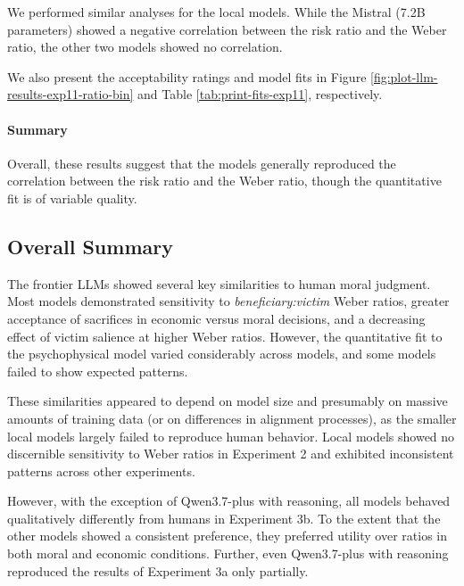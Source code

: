 \documentclass[
]{article}
\begin{document}
We performed similar analyses for the local models. While the Mistral (7.2B parameters) showed a negative correlation between the risk ratio and the Weber ratio, the other two models showed no correlation.

We also present the acceptability ratings and model fits in Figure \ref{fig:plot-llm-results-exp11-ratio-bin} and Table \ref{tab:print-fits-exp11}, respectively.

\paragraph{Summary}\label{summary-2}

Overall, these results suggest that the models generally reproduced the correlation between the risk ratio and the Weber ratio, though the quantitative fit is of variable quality.

\subsection{Overall Summary}\label{overall-summary}

The frontier LLMs showed several key similarities to human moral judgment. Most models demonstrated sensitivity to \emph{beneficiary:victim} Weber ratios, greater acceptance of sacrifices in economic versus moral decisions, and a decreasing effect of victim salience at higher Weber ratios. However, the quantitative fit to the psychophysical model varied considerably across models, and some models failed to show expected patterns.

These similarities appeared to depend on model size and presumably on massive amounts of training data (or on differences in alignment processes), as the smaller local models largely failed to reproduce human behavior. Local models showed no discernible sensitivity to Weber ratios in Experiment 2 and exhibited inconsistent patterns across other experiments.

However, with the exception of Qwen3.7-plus with reasoning, all models behaved qualitatively differently from humans in Experiment 3b. To the extent that the other models showed a consistent preference, they preferred utility over ratios in both moral and economic conditions. Further, even Qwen3.7-plus with reasoning reproduced the results of Experiment 3a only partially.


\end{document}
